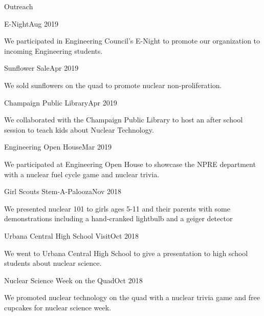 \documentclass{resume2} %
\begin{document}
\begin{rSection}{Outreach}
	\begin{rSubsection}{E-Night}{Aug 2019}{}{}
		\item We participated in Engineering Council's E-Night to promote our
		organization to incoming Engineering students.
	\end{rSubsection}
	\begin{rSubsection}{Sunflower Sale}{Apr 2019}{}{}
		\item We sold sunflowers on the quad to promote nuclear non-proliferation.
	\end{rSubsection}
	\begin{rSubsection}{Champaign Public Library}{Apr 2019}{}{}
		\item We collaborated with the Champaign Public Library to host
		an after school session to teach kids about Nuclear Technology.
	\end{rSubsection}
	\begin{rSubsection}{Engineering Open House}{Mar 2019}{}{}
		\item We participated at Engineering Open House to showcase
		the NPRE department with a nuclear fuel cycle game and nuclear trivia.
	\end{rSubsection}
	\begin{rSubsection}{Girl Scouts Stem-A-Palooza}{Nov 2018}{}{}
		\item We presented nuclear 101 to girls ages 5-11 and their parents with some demonstrations including a hand-cranked lightbulb   		and a geiger detector
	\end{rSubsection}
	\begin{rSubsection}{Urbana Central High School Visit}{Oct 2018}{}{}
		\item We went to Urbana Central High School to give a presentation
		to high school students about nuclear science.
	\end{rSubsection}
	\begin{rSubsection}{Nuclear Science Week on the Quad}{Oct 2018}{}{}
		\item We promoted nuclear technology on the quad with a
		nuclear trivia game and free cupcakes for nuclear science week.
	\end{rSubsection}
\end{rSection}
\end{document}
